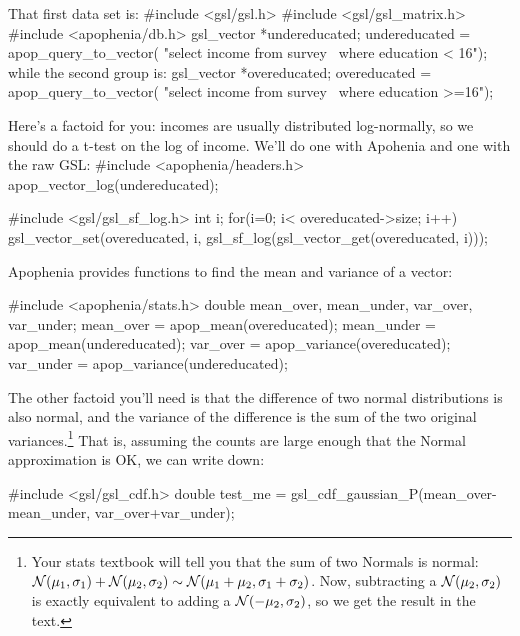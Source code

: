 That first data set is:
#include <gsl/gsl.h>
#include <gsl/gsl_matrix.h>
#include <apophenia/db.h>
gsl_vector	*undereducated;
   undereducated = apop_query_to_vector(
      "select income from survey \
      where education < 16");
while the second group is:
gsl_vector	*overeducated;
   overeducated = apop_query_to_vector(
      "select income from survey \
      where education >=16");

Here's a factoid for you: incomes are usually distributed log-normally, so we should do a t-test on the
log of income. We'll do one with Apohenia and one with the raw GSL:
#include <apophenia/headers.h>
apop_vector_log(undereducated);

#include <gsl/gsl_sf_log.h>
int i;
for(i=0; i< overeducated->size; i++)
   gsl_vector_set(overeducated, i, 
               gsl_sf_log(gsl_vector_get(overeducated, i)));

Apophenia provides functions to find the mean and variance of a vector:

#include <apophenia/stats.h>
double	mean_over, mean_under, var_over, var_under;
mean_over  = apop_mean(overeducated);
mean_under = apop_mean(undereducated);
var_over   = apop_variance(overeducated);
var_under  = apop_variance(undereducated);

The other factoid you'll need is that the difference of two normal
distributions is also normal, and the variance of the difference is
the sum of the two original variances.\footnote{Your stats textbook
will tell you that the sum of two Normals is normal: ${\cal N}(\mu_1,
\sigma_1) + {\cal N}(\mu_2, \sigma_2) \sim {\cal N}(\mu_1 + \mu_2,
\sigma_1 + \sigma_2)$. Now, subtracting a ${\cal N}(\mu_2, \sigma_2)$
is exactly equivalent to adding a ${\cal N}(-\mu_2, \sigma_2)$, so we
get the result in the text.} That is, assuming the counts are large
enough that the Normal approximation is OK, we can write down:

#include <gsl/gsl_cdf.h>
double	test_me = gsl_cdf_gaussian_P(mean_over-mean_under, 
                                       var_over+var_under);


